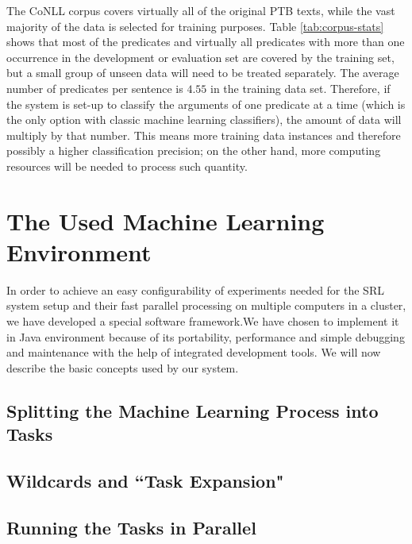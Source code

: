 \documentclass[12pt,notitlepage]{report}
\begin{document}
The CoNLL corpus covers virtually all of the original PTB texts, while the vast majority of the data is selected for training purposes. Table \ref{tab:corpus-stats} shows that most of the predicates and virtually all predicates with more than one occurrence in the development or evaluation set are covered by the training set, but a small group of unseen data will need to be treated separately. The average number of predicates per sentence is $4.55$ in the training data set. Therefore, if the system is set-up to classify the arguments of one predicate at a time (which is the only option with classic machine learning classifiers), the amount of data will multiply by that number. This means more training data instances and therefore possibly a higher classification precision; on the other hand, more computing resources will be needed to process such quantity.

\chapter{The Used Machine Learning Environment}\label{mlprocess}

In order to achieve an easy configurability of experiments needed for the SRL system setup and their fast parallel processing on multiple computers in a cluster, we have developed a special software framework.We have chosen to implement it in Java environment because of its portability, performance and simple debugging and maintenance with the help of integrated development tools. We will now describe the basic concepts used by our system.

\section{Splitting the Machine Learning Process into Tasks}
\section{Wildcards and ``Task Expansion"}
\section{Running the Tasks in Parallel}
\end{document}
